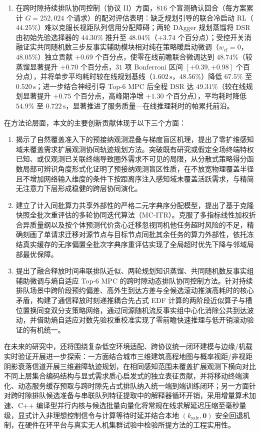 \begin{enumerate}
\item 在跨时隙持续排队协同控制（协议 II）方面，$816$ 个盲测确认回合（每方案累计 $G=252{,}024$ 个请求）的配对评估表明：缺乏规划引导的联合冷启动 RL（$44.25\%$）难以克服长视距队列信用分配障碍；两轮 DAgger 规划蒸馏将 DSR 由初始先验选择器的 $44.30\%$ 推升至 $48.04\%$（$+3.74$ 个百分点）；受控开关消融证实共同随机数三步反事实辅助模块相对纯在策略暖启动微调（$w_{\mathrm{cf}}=0$，$48.05\%$）独立贡献 $+0.69$ 个百分点，使零在线前瞻联合微调达到 $48.74\%$（较蒸馏显著提升 $+0.70$ 个百分点，$31$ 项 Bonferroni 区间 $[+0.39,+0.98]$ 个百分点），并将单步平均耗时较在线规划基线（$1.602\,\mathrm{s}$，$48.56\%$）降低 $67.5\%$ 至 $0.520\,\mathrm{s}$；进一步结合神经引导 Top-6 MPC 后全程 DSR 达 $49.31\%$（较在线规划显著提升 $+0.75$ 个百分点，高峰期净增 $+1.30$ 个百分点），平均耗时降低 $54.9\%$ 至 $0.722\,\mathrm{s}$，显著推进了服务质量—在线推理耗时的帕累托前沿。
\end{enumerate}

在方法论层面，本文的主要创新贡献体现于以下三个方面：

\begin{enumerate}
\item 揭示了自然覆盖准入下的预接纳观测混叠与梯度盲区机理，提出了零扩维感知域未覆盖需求扩展观测协同轨迹规划方法。突破既有研究或假定全场终端特权已知、或仅观测已关联终端导致圈外需求不可见的局限，从分散式策略得分函数局部可辨识角度形式化证明了预接纳观测盲区性质，在不放宽物理覆盖半径且不增加网络输入维度的条件下按距离序注入感知域未覆盖活跃需求，与精简无注意力下层形成稳健的跨层协同演化。

\item 建立了计入同批算力共享外部性的严格二元字典序分配模型，提出了基于克隆快照全批次重评估的多轮协同迭代算法（MC-ITR）。克服了多指标线性加权折合异质量纲以及按个体预测代价贪心迁移忽视同机他任务超时风险的不足，精确刻画了单请求迁移对源节点与目标节点同批其余任务的算力外部性，依托冻结真实缓存的无序偏置全批次字典序重评估实现了全局超时优先下降与邻域局部最优保障。

\item 提出了融合释放时间串联排队近似、两轮规划知识蒸馏、共同随机数反事实组辅助微调与熵自适应 Top-6 MPC 的跨时隙动态排队协同控制方法。针对持续排队场景中跨阶段预约偏差、高外生到达方差与全候选滚动推演高耗时的核心矛盾，构建了通信释放时刻递推耦合先占式 EDF 计算的两阶段近似算子与槽位置换同变双分支策略网络，通过同源随机流反事实组中心化消除公共到达波动，并借助熵自适应对数先验权重校准实现了零前瞻快速推理与低开销滚动验证的有机统一。
\end{enumerate}

在未来的研究中，还将围绕复杂低空环境适配、跨协议统一闭环建模与边缘/机载实时验证开展进一步探索：一方面结合城市三维建筑高程地图与概率视距/非视距阴影衰落信道开展三维避障轨迹规划，在相同感知范围未覆盖扩展观测下横向对比不同上层集合编码结构与显式需求质心启发式的独立表征贡献，并将移动终端演化、动态服务缓存预取与跨时隙先占式排队纳入统一端到端训练闭环；另一方面针对跨时隙排队候选准备与串联队列特征提取中的解释器循环开销，采用增量算术加速、C++ 编译型并行内核与候选批量向量化将常规在线求解延迟压缩至毫秒量级，显式计入非理想控制信令与计算等待时延并结合本地 $(k_{\mathrm{safe}},\mathbf{0})$ 安全回退机制，在硬件在环平台与真实无人机集群试验中检验所提方法的工程实用性。
